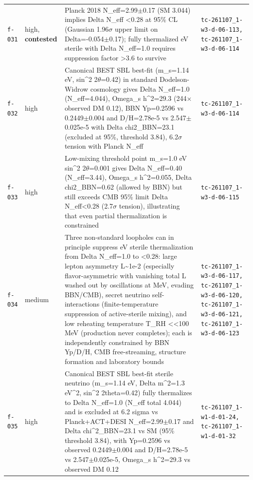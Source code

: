 \documentclass[11pt,a4paper]{article}
\begin{document}
\begin{longtable}{@{}p{}p{}p{}p{}@{}}
\texttt{f-031} & high, \textbf{contested} & Planck 2018 N\_eff=2.99$\pm$0.17 (SM 3.044) implies Delta N\_eff \textless{}0.28 at 95\% CL (Gaussian 1.96$\sigma$ upper limit on Delta=-0.054$\pm$0.17); fully thermalized eV sterile with Delta N\_eff=1.0 requires suppression factor \textgreater{}3.6 to survive & \texttt{tc-261107\_\allowbreak{}1-w3-d-06-113,\allowbreak{} tc-261107\_\allowbreak{}1-w3-d-06-114} \\
\texttt{f-032} & high & Canonical BEST SBL best-fit (m\_s=1.14 eV, sin\textasciicircum{}2 2$\theta$=0.42) in standard Dodelson-Widrow cosmology gives Delta N\_eff=1.0 (N\_eff=4.044), Omega\_s h\textasciicircum{}2=29.3 (244$\times$ observed DM 0.12), BBN Yp=0.2596 vs 0.2449$\pm$0.004 and D/H=2.78e-5 vs 2.547$\pm$0.025e-5 with Delta chi2\_BBN=23.1 (excluded at 95\%, threshold 3.84), 6.2$\sigma$ tension with Planck N\_eff & \texttt{tc-261107\_\allowbreak{}1-w3-d-06-114} \\
\texttt{f-033} & high & Low-mixing threshold point m\_s=1.0 eV sin\textasciicircum{}2 2$\theta$=0.001 gives Delta N\_eff=0.40 (N\_eff=3.44), Omega\_s h\textasciicircum{}2=0.055, Delta chi2\_BBN=0.62 (allowed by BBN) but still exceeds CMB 95\% limit Delta N\_eff\textless{}0.28 (2.7$\sigma$ tension), illustrating that even partial thermalization is constrained & \texttt{tc-261107\_\allowbreak{}1-w3-d-06-115} \\
\texttt{f-034} & medium & Three non-standard loopholes can in principle suppress eV sterile thermalization from Delta N\_eff=1.0 to \textless{}0.28: large lepton asymmetry L\textasciitilde{}1e-2 (especially flavor-asymmetric with vanishing total L washed out by oscillations at MeV, evading BBN/CMB), secret neutrino self-interactions (finite-temperature suppression of active-sterile mixing), and low reheating temperature T\_RH \textless{}\textless{}100 MeV (production never completes); each is independently constrained by BBN Yp/D/H, CMB free-streaming, structure formation and laboratory bounds & \texttt{tc-261107\_\allowbreak{}1-w3-d-06-117,\allowbreak{} tc-261107\_\allowbreak{}1-w3-d-06-120,\allowbreak{} tc-261107\_\allowbreak{}1-w3-d-06-121,\allowbreak{} tc-261107\_\allowbreak{}1-w3-d-06-123} \\
\texttt{f-035} & high & Canonical BEST SBL best-fit sterile neutrino (m\_s=1.14 eV, Delta m\textasciicircum{}2=1.3 eV\textasciicircum{}2, sin\textasciicircum{}2 2theta=0.42) fully thermalizes to Delta N\_eff=1.0 (N\_eff total 4.044) and is excluded at 6.2 sigma vs Planck+ACT+DESI N\_eff=2.99$\pm$0.17 and Delta chi\textasciicircum{}2\_BBN=23.1 vs SM (95\% threshold 3.84), with Yp=0.2596 vs observed 0.2449$\pm$0.004 and D/H=2.78e-5 vs 2.547$\pm$0.025e-5, Omega\_s h\textasciicircum{}2=29.3 vs observed DM 0.12 & \texttt{tc-261107\_\allowbreak{}1-w1-d-01-24,\allowbreak{} tc-261107\_\allowbreak{}1-w1-d-01-32} \\

\end{longtable}
\end{document}
